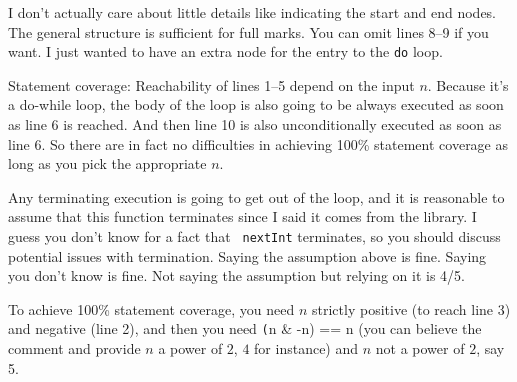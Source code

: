 \documentclass[11pt,onecolumn,letterpaper]{article}
\begin{document}
\begin{center}
\end{center}

I don't actually care about little details like indicating the start
and end nodes. The general structure is sufficient for full marks. You can
omit lines 8--9 if you want. I just wanted to have an extra node for the entry
to the {\tt do} loop.

Statement coverage: Reachability of lines 1--5 depend on the input $n$.
Because it's a do-while loop, the body of the loop is also going to be
always executed as soon as line 6 is reached. And then line 10 is also
unconditionally executed as soon as line 6. So there are in fact
no difficulties in achieving 100\% statement coverage as long
as you pick the appropriate $n$.

Any terminating execution is going to get out of the loop, and it is
reasonable to assume that this function terminates since I said it
comes from the library. I guess you don't know for a fact that {\tt
  nextInt} terminates, so you should discuss potential issues with
termination.  Saying the assumption above is fine. Saying you don't
know is fine. Not saying the assumption but relying on it is 4/5.

To achieve 100\% statement coverage, you need $n$ strictly positive
(to reach line 3) and negative (line 2), and then you need {\texttt (n
  \& -n) == n} (you can believe the comment and provide $n$ a power of
$2$, $4$ for instance) and $n$ not a power of $2$, say 5.
\end{document}
